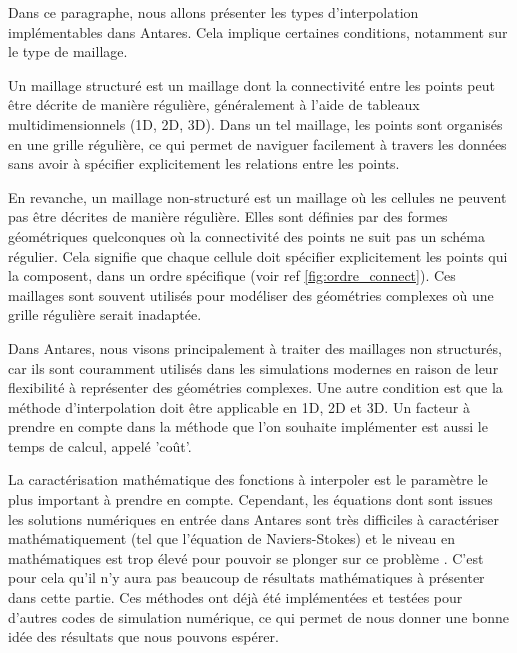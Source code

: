 Dans ce paragraphe, nous allons présenter les types d'interpolation \cite{cassiopee2015} implémentables dans Antares.
Cela implique certaines conditions, notamment sur le type de maillage.

Un maillage structuré est un maillage dont la connectivité\label{connectivité} entre les points peut être décrite de manière régulière, généralement à l'aide de tableaux multidimensionnels (1D, 2D, 3D). Dans un tel maillage, les points sont organisés en une grille régulière, ce qui permet de naviguer facilement à travers les données sans avoir à spécifier explicitement les relations entre les points.

En revanche, un maillage non-structuré est un maillage où les cellules ne peuvent pas être décrites de manière régulière. Elles sont définies par des formes géométriques quelconques où la connectivité des points ne suit pas un schéma régulier. Cela signifie que chaque cellule doit spécifier explicitement les points qui la composent, dans un ordre spécifique (voir ref \ref{fig:ordre_connect}). Ces maillages sont souvent utilisés pour modéliser des géométries complexes où une grille régulière serait inadaptée.

Dans Antares, nous visons principalement à traiter des maillages non structurés, car ils sont couramment utilisés dans les simulations modernes en raison de leur flexibilité à représenter des géométries complexes. Une autre condition est que la méthode d'interpolation doit être applicable en 1D, 2D et 3D. Un facteur à prendre en compte dans la méthode que l'on souhaite implémenter est aussi le temps de calcul, appelé 'coût'.

La caractérisation mathématique des fonctions à interpoler est le paramètre le plus important à prendre en compte. Cependant, les équations dont sont issues les solutions numériques en entrée dans Antares sont très difficiles à caractériser mathématiquement (tel que l'équation de Naviers-Stokes) et le niveau en mathématiques est trop élevé pour pouvoir se plonger sur ce problème \cite{gordont1971_2}. C'est pour cela qu'il n'y aura pas beaucoup de résultats mathématiques à présenter dans cette partie.
Ces méthodes ont déjà été implémentées et testées pour d'autres codes de simulation numérique, ce qui permet de nous donner une bonne idée des résultats que nous pouvons espérer.


